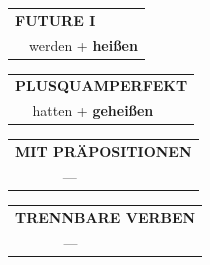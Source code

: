 \documentclass[10pt,a4paper]{revtex4-2}
\begin{document}
\begin{verbbox}
\begin{tabular}{rl}
    \multicolumn{2}{l}{\textbf{FUTURE I} }\\
   & werden + \textbf{heißen}\\
 
  \end{tabular}
\hfill
   \begin{tabular}{rl}
      \multicolumn{2}{l}{\textbf{PLUSQUAMPERFEKT}}\\
   & hatten + \textbf{geheißen}\\
  \end{tabular}
  
  \vspace{10pt}



\begin{tabular}{lll}
\multicolumn{3}{l}{\textbf{MIT PRÄPOSITIONEN}}\\
& ---\\
\end{tabular}
\hfill
\begin{tabular}{lll}
\multicolumn{3}{l}{\textbf{TRENNBARE VERBEN}}\\
& ---\\
\end{tabular}

  \vspace{-5pt}

\end{verbbox}
\end{document}

